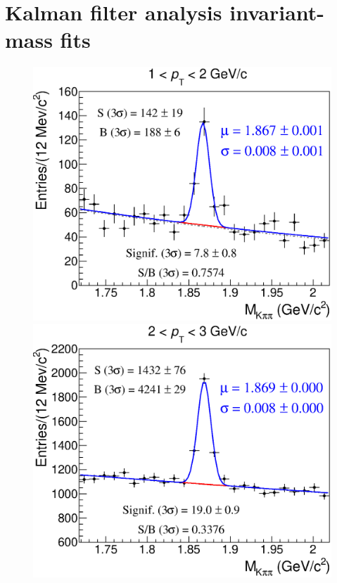 \documentclass[b5paper,10pt,twoside,oldstyle,classica]{toptesi}
\begin{document}
\section{Kalman filter analysis invariant-mass fits}
\label{appendix_KF}
\begin{figure}[h]
\begin{center}
{\includegraphics[scale = 0.25]{MassFits_cutset1_0.eps}}
\hspace{0cm}
{\includegraphics[scale = 0.25]{MassFits_cutset1_1.eps}}

\end{center}
\end{figure}
\end{document}
